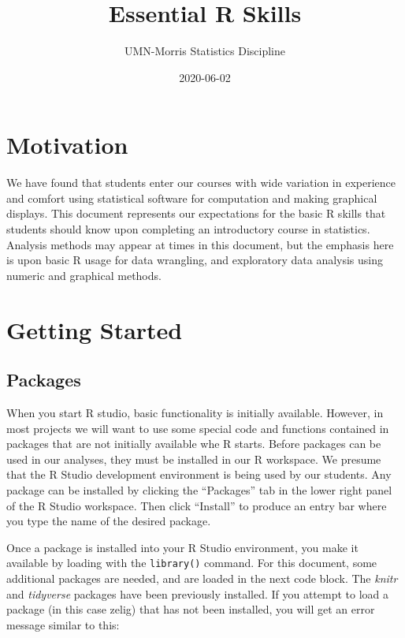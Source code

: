 \documentclass[]{book}
\title{Essential R Skills}
\author{UMN-Morris Statistics Discipline}
\date{2020-06-02}
\begin{document}
\maketitle

{
\setcounter{tocdepth}{1}
\tableofcontents
}
\chapter{Motivation}\label{motivation}

We have found that students enter our courses with wide variation in
experience and comfort using statistical software for computation and
making graphical displays. This document represents our expectations for
the basic R skills that students should know upon completing an
introductory course in statistics. Analysis methods may appear at times
in this document, but the emphasis here is upon basic R usage for data
wrangling, and exploratory data analysis using numeric and graphical
methods.

\chapter{Getting Started}\label{GettingStarted}

\section{Packages}\label{packages}

When you start R studio, basic functionality is initially available.
However, in most projects we will want to use some special code and
functions contained in packages that are not initially available whe R
starts. Before packages can be used in our analyses, they must be
installed in our R workspace. We presume that the R Studio development
environment is being used by our students. Any package can be installed
by clicking the ``Packages'' tab in the lower right panel of the R
Studio workspace. Then click ``Install'' to produce an entry bar where
you type the name of the desired package.

Once a package is installed into your R Studio environment, you make it
available by loading with the \texttt{library()} command. For this
document, some additional packages are needed, and are loaded in the
next code block. The \emph{knitr} and \emph{tidyverse} packages have
been previously installed. If you attempt to load a package (in this
case zelig) that has not been installed, you will get an error message
similar to this:
\end{document}
